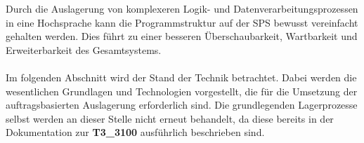 Durch die Auslagerung von komplexeren Logik- und Datenverarbeitungsprozessen in eine Hochsprache kann die Programmstruktur auf der SPS bewusst vereinfacht gehalten werden. Dies führt zu einer besseren Überschaubarkeit, Wartbarkeit und Erweiterbarkeit des Gesamtsystems.\\\\
Im folgenden Abschnitt wird der Stand der Technik betrachtet. Dabei werden die wesentlichen Grundlagen und Technologien vorgestellt, die für die Umsetzung der auftragsbasierten Auslagerung erforderlich sind. Die grundlegenden Lagerprozesse selbst werden an dieser Stelle nicht erneut behandelt, da diese bereits in der Dokumentation zur \textbf{T3\_3100} ausführlich beschrieben sind.





